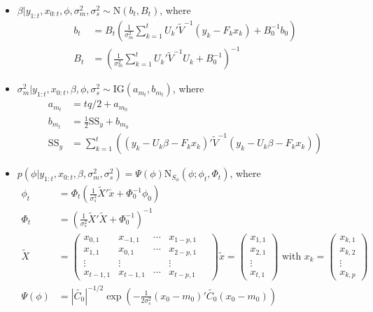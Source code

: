 \documentclass{article}
\begin{document}
\begin{itemize}
\item $\beta|y_{1:t},x_{0:t},\phi,\sigma^2_m,\sigma^2_s \sim \mbox{N}(b_t,B_t)$, where
\begin{align*}
b_t &= B_t\left(\frac{1}{\sigma^2_m} \sum^t_{k=1} U_k'\tilde{V}^{-1}(y_k - F_kx_k) + B_0^{-1}b_0\right) \\
B_t &= \left(\frac{1}{\sigma^2_m} \sum^t_{k=1} U_k'\tilde{V}^{-1}U_k + B_0^{-1}\right)^{-1}
\end{align*}
\item $\sigma^2_m|y_{1:t},x_{0:t},\beta,\phi,\sigma^2_s \sim \mbox{IG}(a_{m_t}, b_{m_t})$, where
\begin{align*}
a_{m_t} &= tq/2 + a_{m_0} \\
b_{m_t} &= \frac{1}{2}\mbox{SS}_y + b_{m_0} \\
\mbox{SS}_y &= \sum^t_{k=1} \left((y_k - U_k\beta - F_kx_k)'\tilde{V}^{-1}(y_k - U_k\beta - F_kx_k)\right)
\end{align*}
\item $p(\phi|y_{1:t},x_{0:t},\beta,\sigma^2_m,\sigma^2_s) = \Psi(\phi)\mbox{N}_{S_\phi}(\phi; \phi_t,\Phi_t)$, where
\begin{align*}
\phi_t &= \Phi_t\left(\frac{1}{\sigma^2_s} \tilde{X}'\tilde{x} + \Phi_0^{-1}\phi_0\right) \\
\Phi_t &= \left(\frac{1}{\sigma^2_s} \tilde{X}'\tilde{X} + \Phi_0^{-1}\right)^{-1} \\
\tilde{X} &= \left(\begin{array}{ccccc}
x_{0,1} & x_{-1,1} & \cdots & x_{1-p,1} \\
x_{1,1} & x_{0,1} & \cdots & x_{2-p,1} \\
\vdots & \vdots & & \vdots \\
x_{t-1,1} & x_{t-1,1} & \cdots & x_{t-p,1}
\end{array} \quad
\right) \tilde{x} = \left(\begin{array}{c} x_{1,1} \\ x_{2,1} \\ \vdots \\ x_{t,1} \end{array}\right)
\mbox{ with } x_k = \left(\begin{array}{c} x_{k,1} \\ x_{k,2} \\ \vdots \\ x_{k,p} \end{array}\right) \\
\Psi(\phi) &= \left|\tilde{C_0}\right|^{-1/2}\exp\left(-\frac{1}{2\sigma^2_s}(x_0-m_0)'\tilde{C_0}(x_0-m_0)\right)

\end{align*}
\end{itemize}
\end{document}
